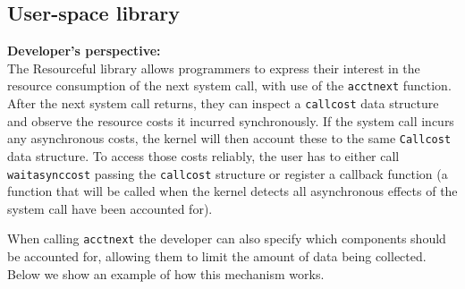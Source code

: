 \documentclass[12pt]{article}
\def\_{\textunderscore\-}
\begin{document}
\subsection{User-space library}
\textbf{Developer’s perspective:\\}
The Resourceful library allows programmers to express their interest in the resource consumption of the next system call, with use of the \texttt{acct\_next} function. After the next system call returns, they can inspect a \texttt{call\_cost} data structure and observe the resource costs it incurred synchronously. 
If the system call incurs any asynchronous costs, the kernel will then account these to the same \texttt{Call\_cost} data structure. To access those costs reliably, the user has to either call \texttt{wait\_async\_cost} passing the \texttt{call\_cost} structure or register a callback function (a function that will be called when the kernel detects all asynchronous effects of the system call have been accounted for).

When calling \texttt{acct\_next} the developer can also specify which components should be accounted for, allowing them to limit the amount of data being collected.
Below we show an example of how this mechanism works.
\end{document}
